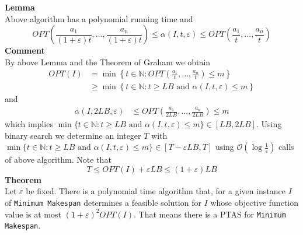 \documentclass[a4paper, 12pt]{article}
\begin{document}
	\textbf{Lemma}\\
	Above algorithm has a polynomial running time and \[OPT\left(\frac{a_1}{(1+\varepsilon)t},...,\frac{a_n}{(1+\varepsilon)t}\right) \leq \alpha(I,t,\varepsilon) \leq OPT\left(\frac{a_1}{t},...,\frac{a_n}{t}\right)\]
	\textbf{Comment}\\
	By above Lemma and the Theorem of Graham we obtain \begin{align*}
		OPT(I) &= \min\left\{t \in \mathbb{N}: OPT\left(\frac{a_1}{t},...,\frac{a_n}{t}\right) \leq m\right\}\\
		& \geq \min\left\{t \in \mathbb{N}: t \geq LB \text{ and } \alpha(I,t,\varepsilon) \leq m\right\}
	\end{align*} and \begin{align*}
	\alpha(I, 2LB, \varepsilon) & \leq OPT\left(\frac{a_1}{2LB},...,\frac{a_n}{2LB}\right) \leq m
	\end{align*} which implies $\min\{t \in \mathbb{N}: t \geq LB \text{ and } \alpha(I,t,\varepsilon) \leq m\} \in [LB,2LB]$. Using binary search we determine an integer $T$ with $\min\{t \in \mathbb{N}: t \geq LB \text{ and } \alpha(I,t,\varepsilon) \leq m\} \in [T-\varepsilon LB, T]$ using $\mathcal{O}\left(\log \frac{1}{\varepsilon}\right)$ calls of above algorithm. Note that \[T \leq OPT(I)+\varepsilon LB \leq (1+\varepsilon) LB\]
	\textbf{Theorem}\\
	Let $\varepsilon$ be fixed. There is a polynomial time algorithm that, for a given instance $I$ of \texttt{Minimum Makespan} determines a feasible solution for $I$ whose objective function value is at most $(1+\varepsilon)^2OPT(I)$. That means there is a PTAS for \texttt{Minimum Makespan}.
\end{document}
